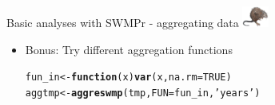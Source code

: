 \documentclass[xcolor=dvipsnames,serif]{beamer}\usepackage[]{graphicx}\usepackage[]{color}
\makeatletter
\newcommand{\hlnum}[1]{\textcolor[rgb]{0.686,0.059,0.569}{#1}}%
\newcommand{\hlstr}[1]{\textcolor[rgb]{0.192,0.494,0.8}{#1}}%
\newcommand{\hlstd}[1]{\textcolor[rgb]{0.345,0.345,0.345}{#1}}%
\newcommand{\hlkwa}[1]{\textcolor[rgb]{0.161,0.373,0.58}{\textbf{#1}}}%
\newcommand{\hlkwb}[1]{\textcolor[rgb]{0.69,0.353,0.396}{#1}}%
\newcommand{\hlkwc}[1]{\textcolor[rgb]{0.333,0.667,0.333}{#1}}%
\newcommand{\hlkwd}[1]{\textcolor[rgb]{0.737,0.353,0.396}{\textbf{#1}}}%
\newenvironment{kframe}{%
 \def\at@end@of@kframe{}%
 \ifinner\ifhmode%
  \def\at@end@of@kframe{\end{minipage}}%
  \begin{minipage}{\columnwidth}%
 \fi\fi%
 \def\FrameCommand##1{\hskip\@totalleftmargin \hskip-\fboxsep
 \colorbox{shadecolor}{##1}\hskip-\fboxsep
     \hskip-\linewidth \hskip-\@totalleftmargin \hskip\columnwidth}%
 \MakeFramed {\advance\hsize-\width
   \@totalleftmargin\z@ \linewidth\hsize
   \@setminipage}}%
 {\par\unskip\endMakeFramed%
 \at@end@of@kframe}
\newenvironment{knitrout}{}{} %
\makeatother
\begin{document}
\begin{frame}[fragile,t]{Basic analyses with SWMPr - aggregating data \includegraphics[width = 0.065\textwidth]{imgs/swmprat.png}}
\begin{itemize}
\begin{knitrout}
\begin{kframe}
\end{kframe}
\end{knitrout}
\vspace{0.1in}
\item
{}
Bonus: Try different aggregation functions
\begin{knitrout}\scriptsize
{}\color{fgcolor}\begin{kframe}
\begin{alltt}
\hlstd{fun_in} \hlkwb{<-} \hlkwa{function}\hlstd{(}\hlkwc{x}\hlstd{)}  \hlkwd{var}\hlstd{(x,} \hlkwc{na.rm} \hlstd{=} \hlnum{TRUE}\hlstd{)}
\hlstd{aggtmp} \hlkwb{<-} \hlkwd{aggreswmp}\hlstd{(tmp,} \hlkwc{FUN} \hlstd{= fun_in,} \hlstr{'years'}\hlstd{)}
\end{alltt}
\end{kframe}
\end{knitrout}
\vspace{0.1in}
\end{itemize}
\end{frame}
\end{document}

